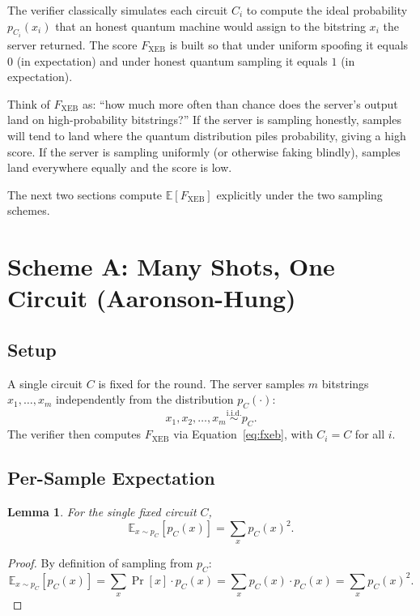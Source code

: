 \documentclass[11pt]{article}
\theoremstyle{plain}
\newtheorem{lemma}[theorem]{Lemma}
\theoremstyle{definition}
\newcommand{\Fxeb}{F_{\text{XEB}}}
\newcommand{\E}{\mathbb{E}}
\begin{document}
The verifier classically simulates each circuit $C_i$ to compute the ideal probability $p_{C_i}(x_i)$ that an honest quantum machine would assign to the bitstring $x_i$ the server returned. The score $\Fxeb$ is built so that under uniform spoofing it equals $0$ (in expectation) and under honest quantum sampling it equals $1$ (in expectation).

\begin{intuition}
Think of $\Fxeb$ as: ``how much more often than chance does the server's output land on high-probability bitstrings?'' If the server is sampling honestly, samples will tend to land where the quantum distribution piles probability, giving a high score. If the server is sampling uniformly (or otherwise faking blindly), samples land everywhere equally and the score is low.
\end{intuition}

The next two sections compute $\E[\Fxeb]$ explicitly under the two sampling schemes.

\section{Scheme A: Many Shots, One Circuit (Aaronson-Hung)}

\subsection{Setup}

A single circuit $C$ is fixed for the round. The server samples $m$ bitstrings $x_1, \ldots, x_m$ independently from the distribution $p_C(\cdot)$:
\[
x_1, x_2, \ldots, x_m \overset{\text{i.i.d.}}{\sim} p_C.
\]
The verifier then computes $\Fxeb$ via Equation~\eqref{eq:fxeb}, with $C_i = C$ for all $i$.

\subsection{Per-Sample Expectation}

\begin{lemma}
For the single fixed circuit $C$,
\begin{equation}
\E_{x \sim p_C}[p_C(x)] = \sum_x p_C(x)^2.
\label{eq:scheme-a-per-sample}
\end{equation}
\end{lemma}

\begin{proof}
By definition of sampling from $p_C$:
\[
\E_{x \sim p_C}[p_C(x)] = \sum_{x} \Pr[x] \cdot p_C(x) = \sum_x p_C(x) \cdot p_C(x) = \sum_x p_C(x)^2.
\]
\end{proof}
\end{document}
